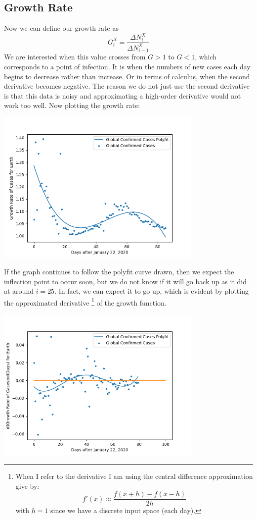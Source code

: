 \documentclass{report}
\begin{document}
        \subsection{Growth Rate}
        Now we can define our growth rate as 
        \begin{equation}
            G^X_i = \dfrac{\Delta N^X_i}{\Delta N^X_{i - 1}}
        \end{equation}
        We are interested when this value crosses from $G > 1$ to $G < 1$, which corresponds to a point of infection. It is when the numbers of new cases each day begins to decrease rather than increase. Or in terms of calculus, when the second derivative becomes negative. The reason we do not just use the second derivative is that this data is noisy and approximating a high-order derivative would not work too well. Now plotting the growth rate:
        \begin{center}
            \includegraphics[width=10cm]{plots/global/growth_rate.png}
        \end{center}
        If the graph continues to follow the polyfit curve drawn, then we expect the inflection point to occur soon, but we do not know if it will go back up as it did at around $i = 25$. In fact, we can expect it to go up, which is evident by plotting the approximated derivative
        \footnote{
            When I refer to the derivative I am using the central difference approximation give by:
            $$f'(x) \approx \dfrac{f(x + h) - f(x - h)}{2h}$$
            with $h = 1$ since we have a discrete input space (each day).
            } of the growth function.
            \begin{center}
                \includegraphics[width=10cm]{plots/global/growth_rate_derivative.png}
            \end{center} 
\end{document}
